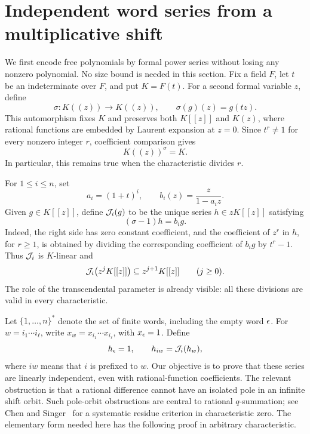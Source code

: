 \section{Independent word series from a multiplicative shift}\label{sec:words}

We first encode free polynomials by formal power series without losing any
nonzero polynomial. No size bound is needed in this section. Fix a field $F$,
let $t$ be an indeterminate over $F$, and put $K=F(t)$. For a second formal
variable $z$, define
\[
 \sigma:K((z))\longrightarrow K((z)),\qquad
 \sigma(g)(z)=g(tz).
\]
This automorphism fixes $K$ and preserves both $K[[z]]$ and $K(z)$, where
rational functions are embedded by Laurent expansion at $z=0$.
Since $t^r\ne1$ for every nonzero integer $r$, coefficient comparison gives
\begin{equation}\label{eq:fixed-field}
 K((z))^\sigma=K.
\end{equation}
In particular, this remains true when the characteristic divides $r$.

For $1\le i\le n$, set
\begin{equation}\label{eq:letters}
 a_i=(1+t)^i,\qquad b_i(z)=\frac{z}{1-a_i z}.
\end{equation}
Given $g\in K[[z]]$, define $\mathcal J_i(g)$ to be the unique series
$h\in zK[[z]]$ satisfying
\begin{equation}\label{eq:shift-antiderivative}
 (\sigma-1)h=b_i g.
\end{equation}
Indeed, the right side has zero constant coefficient, and the coefficient
of $z^r$ in $h$, for $r\ge1$, is obtained by dividing the corresponding coefficient of
$b_i g$ by $t^r-1$. Thus $\mathcal J_i$ is $K$-linear and
\begin{equation}\label{eq:order-raising}
 \mathcal J_i\bigl(z^jK[[z]]\bigr)\subseteq z^{j+1}K[[z]]\qquad(j\ge0).
\end{equation}
The role of the transcendental parameter is already visible: all these
divisions are valid in every characteristic.

Let $\{1,\ldots,n\}^*$ denote the set of finite words, including the empty
word $\epsilon$. For $w=i_1\cdots i_\ell$, write
$x_w=x_{i_1}\cdots x_{i_\ell}$, with $x_\epsilon=1$. Define
\begin{equation}\label{eq:word-series}
 h_\epsilon=1,\qquad h_{iw}=\mathcal J_i(h_w),
\end{equation}
where $iw$ means that $i$ is prefixed to $w$.
Our objective is to prove that these series are linearly independent, even
with rational-function coefficients. The relevant obstruction is that a
rational difference cannot have an isolated pole in an infinite shift orbit.
Such pole-orbit obstructions are central to rational $q$-summation;
see Chen and Singer~\cite[Section~2.3]{ChenSinger2012} for a systematic
residue criterion in characteristic zero. The elementary form needed here
has the following proof in arbitrary characteristic.

